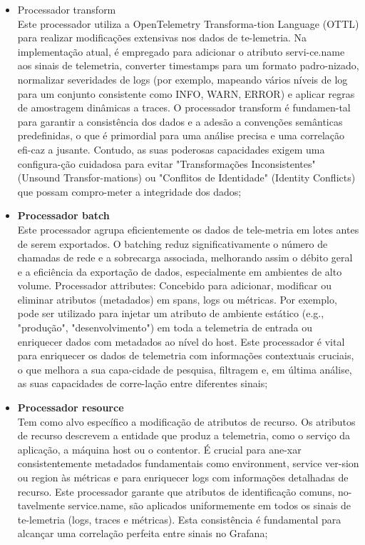 \begin{itemize}
    \item{Processador transform} \\ Este processador utiliza a OpenTelemetry Transforma-tion Language (OTTL) para realizar modificações extensivas nos dados de te-lemetria. Na implementação atual, é empregado para adicionar o atributo servi-ce.name aos sinais de telemetria, converter timestamps para um formato padro-nizado, normalizar severidades de logs (por exemplo, mapeando vários níveis de log para um conjunto consistente como INFO, WARN, ERROR) e aplicar regras de amostragem dinâmicas a traces. O processador transform é fundamen-tal para garantir a consistência dos dados e a adesão a convenções semânticas predefinidas, o que é primordial para uma análise precisa e uma correlação efi-caz a jusante. Contudo, as suas poderosas capacidades exigem uma configura-ção cuidadosa para evitar "Transformações Inconsistentes" (Unsound Transfor-mations) ou "Conflitos de Identidade" (Identity Conflicts) que possam compro-meter a integridade dos dados;
    
    \item \textbf{Processador batch}  \\ Este processador agrupa eficientemente os dados de tele-metria em lotes antes de serem exportados. O batching reduz significativamente o número de chamadas de rede e a sobrecarga associada, melhorando assim o débito geral e a eficiência da exportação de dados, especialmente em ambientes de alto volume. Processador attributes: Concebido para adicionar, modificar ou eliminar atributos (metadados) em spans, logs ou métricas. Por exemplo, pode ser utilizado para injetar um atributo de ambiente estático (e.g., "produção", "desenvolvimento") em toda a telemetria de entrada ou enriquecer dados com metadados ao nível do host. Este processador é vital para enriquecer os dados de telemetria com informações contextuais cruciais, o que melhora a sua capa-cidade de pesquisa, filtragem e, em última análise, as suas capacidades de corre-lação entre diferentes sinais;
    
    \item \textbf{Processador resource} \\ Tem como alvo específico a modificação de atributos de recurso. Os atributos de recurso descrevem a entidade que produz a telemetria, como o serviço da aplicação, a máquina host ou o contentor. É crucial para ane-xar consistentemente metadados fundamentais como environment, service ver-sion ou region às métricas e para enriquecer logs com informações detalhadas de recurso. Este processador garante que atributos de identificação comuns, no-tavelmente service.name, são aplicados uniformemente em todos os sinais de te-lemetria (logs, traces e métricas). Esta consistência é fundamental para alcançar uma correlação perfeita entre sinais no Grafana;
    

\end{itemize}
